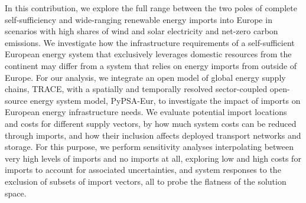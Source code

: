 In this contribution, we explore the full range between the two poles of
complete self-sufficiency and wide-ranging renewable energy imports into Europe
in scenarios with high shares of wind and solar electricity and net-zero carbon
emissions. We investigate how the infrastructure requirements of a
self-sufficient European energy system that exclusively leverages domestic
resources from the continent may differ from a system that relies on energy
imports from outside of Europe. For our analysis, we integrate an open model of
global energy supply chains, TRACE,\cite{hamppImportOptions2023} with a
spatially and temporally resolved sector-coupled open-source energy system
model, PyPSA-Eur,\cite{PyPSAEurSecSectorCoupled} to investigate the impact of
imports on European energy infrastructure needs. We evaluate potential import
locations and costs for different supply vectors, by how much system costs can
be reduced through imports, and how their inclusion affects deployed transport
networks and storage. For this purpose, we perform sensitivity analyses
interpolating between very high levels of imports and no imports at all,
exploring low and high costs for imports to account for associated
uncertainties, and system responses to the exclusion of subsets of import
vectors, all to probe the flatness of the solution space.


